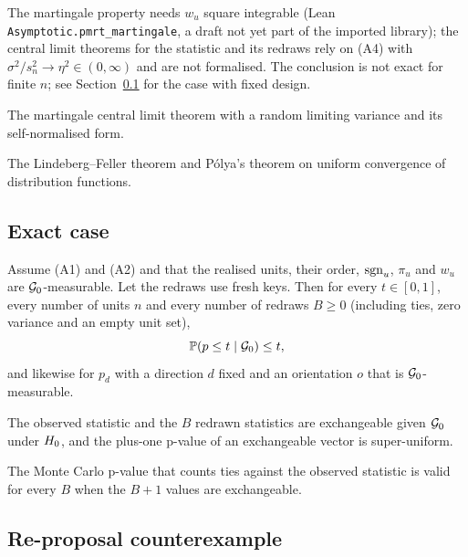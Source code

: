 \noindent The martingale property needs $w_u$ square integrable (Lean \texttt{Asymptotic.pmrt\_martingale}, a draft not yet part of the imported library); the central limit theorems for the statistic and its redraws rely on (A4) with $\sigma^2/s_n^2 \to \eta^2 \in (0,\infty)$ and are not formalised. The conclusion is not exact for finite $n$; see Section~\ref{spec:thm.exact} for the case with fixed design.


The martingale central limit theorem with a random limiting variance and its self-normalised form.

The Lindeberg--Feller theorem and P\'olya's theorem on uniform convergence of distribution functions.

\subsection{Exact case}
\label{spec:thm.exact}

\begin{lemma}
Assume (A1) and (A2) and that the realised units, their order, $\mathrm{sgn}_u$, $\pi_u$ and $w_u$ are $\mathcal{G}_{0}$-measurable. Let the redraws use fresh keys. Then for every $t \in [0,1]$, every number of units $n$ and every number of redraws $B \ge 0$ (including ties, zero variance and an empty unit set),
\begin{equation*}
\mathbb{P}(p \le t \mid \mathcal{G}_{0}) \le t,
\end{equation*}
and likewise for $p_d$ with a direction $d$ fixed and an orientation $o$ that is $\mathcal{G}_{0}$-measurable.
\end{lemma}

\noindent The observed statistic and the $B$ redrawn statistics are exchangeable given $\mathcal{G}_{0}$ under $H_0$, and the plus-one p-value of an exchangeable vector is super-uniform.


The Monte Carlo p-value that counts ties against the observed statistic is valid for every $B$ when the $B + 1$ values are exchangeable.

\subsection{Re-proposal counterexample}
\label{spec:thm.counterex}

